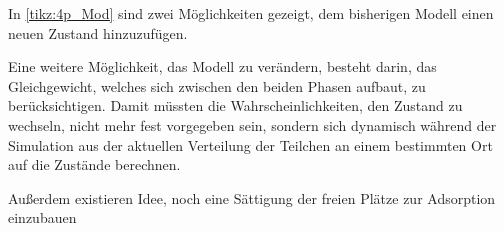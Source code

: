 In \ref{tikz:4p_Mod} sind zwei Möglichkeiten gezeigt, dem bisherigen Modell einen neuen Zustand hinzuzufügen.
 
% 
% 
%         
% 
%         
% 
% 
%  
%   
% 
% 
% 
%         
%         

Eine weitere Möglichkeit, das Modell zu verändern, besteht darin, das Gleichgewicht, welches sich zwischen den beiden Phasen aufbaut, zu berücksichtigen. Damit müssten die Wahrscheinlichkeiten, den Zustand zu wechseln, nicht mehr fest vorgegeben sein, sondern sich dynamisch während der Simulation aus der aktuellen Verteilung der Teilchen an einem bestimmten Ort auf die Zustände berechnen.

Außerdem existieren Idee, noch eine Sättigung der freien Plätze zur Adsorption einzubauen


